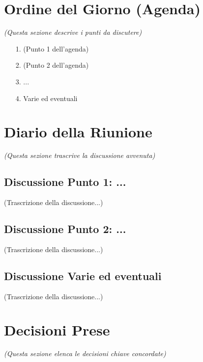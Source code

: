 \documentclass[a4paper, 11pt, oneside]{scrartcl} %
\begin{document}
\newpage
\section{Ordine del Giorno (Agenda)}
\emph{(Questa sezione descrive i punti da discutere)}

\begin{itemize}
    \item[1.] (Punto 1 dell'agenda)
    \item[2.] (Punto 2 dell'agenda)
    \item[3.] ...
    \item[4.] Varie ed eventuali
\end{itemize}

\newpage
\section{Diario della Riunione}
\emph{(Questa sezione trascrive la discussione avvenuta)}

\subsection{Discussione Punto 1: ...}
(Trascrizione della discussione...)

\subsection{Discussione Punto 2: ...}
(Trascrizione della discussione...)

\subsection{Discussione Varie ed eventuali}
(Trascrizione della discussione...)

\newpage
\section{Decisioni Prese}
\emph{(Questa sezione elenca le decisioni chiave concordate)}
\end{document}
